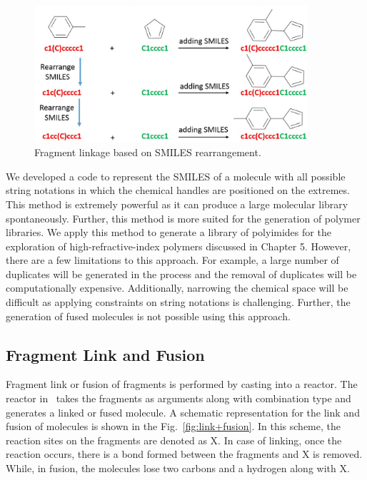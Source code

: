 \begin{figure}[htbp] 
	\centering
	\includegraphics[width=0.9\textwidth]{Chapter-4/Figures/SMILES_link.jpg}
	\caption{Fragment linkage based on SMILES rearrangement.} 
	\label{fig:SMILES_link} 
\end{figure}  

We developed a code to represent the SMILES of a molecule with all possible string notations in which the chemical handles are positioned on the extremes. This method is extremely powerful as it can produce a large molecular library spontaneously. Further, this method is more suited for the generation of polymer libraries. We apply this method to generate a library of polyimides for the exploration of high-refractive-index polymers discussed in Chapter 5. However, there are a few limitations to this approach. For example, a large number of duplicates will be generated in the process and the removal of duplicates will be computationally expensive. Additionally, narrowing the chemical space will be difficult as applying constraints on string notations is challenging. Further, the generation of fused molecules is not possible using this approach.

\subsection{Fragment Link and Fusion}

Fragment link or fusion of fragments is performed by casting into a reactor. The reactor in \chemlg\ takes the fragments as arguments along with combination type and generates a linked or fused molecule. A schematic representation for the link and fusion of molecules is shown in the Fig.\ \ref{fig:link+fusion}. In this scheme, the reaction sites on the fragments are denoted as X. In case of linking, once the reaction occurs, there is a bond formed between the fragments and X is removed. While, in fusion, the molecules lose two carbons and a hydrogen along with X.

